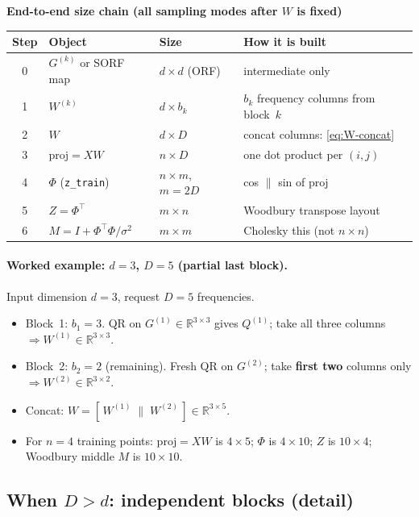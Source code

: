 \documentclass[11pt]{article}
\newcommand{\noise}{\sigma^2}
\newcommand{\Ph}{\Phi}
\newcommand{\Zmat}{Z}
\begin{document}
\begin{samebox}
\textbf{End-to-end size chain (all sampling modes after $W$ is fixed)}
\begin{center}
\renewcommand{\arraystretch}{1.3}
\begin{tabular}{@{}clll@{}}
\toprule
\textbf{Step} & \textbf{Object} & \textbf{Size} & \textbf{How it is built} \\
\midrule
0 & $G^{(k)}$ or SORF map & $d\times d$ (ORF) & intermediate only \\
1 & $W^{(k)}$ & $d\times b_k$ & $b_k$ frequency columns from block~$k$ \\
2 & $W$ & $d\times D$ & concat columns: \eqref{eq:W-concat} \\
3 & $\mathrm{proj}=XW$ & $n\times D$ & one dot product per $(i,j)$ \\
4 & $\Ph$ (\texttt{z\_train}) & $n\times m$, $m=2D$ & cos $\|$ sin of $\mathrm{proj}$ \\
5 & $\Zmat=\Ph^{\top}$ & $m\times n$ & Woodbury transpose layout \\
6 & $M=I+\Ph^{\top}\Ph/\noise$ & $m\times m$ & Cholesky this (not $n\times n$) \\
\bottomrule
\end{tabular}
\end{center}
\end{samebox}

\paragraph{Worked example: $d=3$, $D=5$ (partial last block).}
Input dimension $d=3$, request $D=5$ frequencies.
\begin{itemize}[nosep]
  \item Block~1: $b_1=3$. QR on $G^{(1)}\in\mathbb{R}^{3\times 3}$ gives $Q^{(1)}$; take all three columns
        $\Rightarrow W^{(1)}\in\mathbb{R}^{3\times 3}$.
  \item Block~2: $b_2=2$ (remaining). Fresh QR on $G^{(2)}$; take \textbf{first two} columns only
        $\Rightarrow W^{(2)}\in\mathbb{R}^{3\times 2}$.
  \item Concat: $W=[\,W^{(1)} \;\|\; W^{(2)}\,]\in\mathbb{R}^{3\times 5}$.
  \item For $n=4$ training points: $\mathrm{proj}=XW$ is $4\times 5$; $\Ph$ is $4\times 10$; $\Zmat$ is $10\times 4$;
        Woodbury middle $M$ is $10\times 10$.
\end{itemize}

\subsection{When $D > d$: independent blocks (detail)}
\label{sec:blocks}
\end{document}
